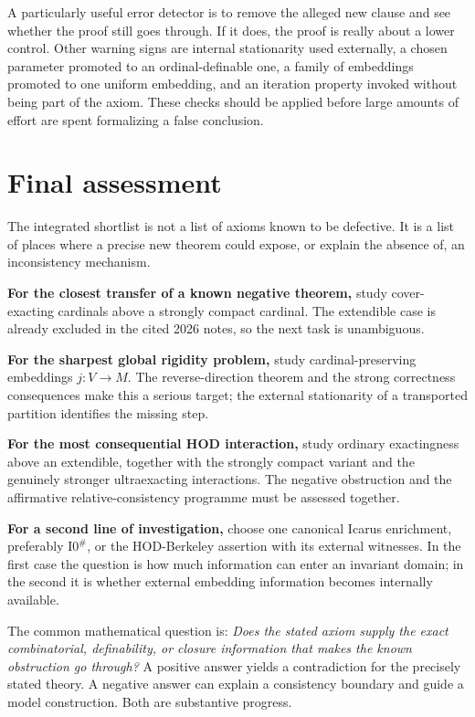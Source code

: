 \documentclass[11pt,letterpaper]{article}
\theoremstyle{definition}
\newcommand{\Isharp}{\mathrm{I0}^{\#}}
\begin{document}
A particularly useful error detector is to remove the alleged new clause and see whether the proof still goes through. If it does, the proof is really about a lower control. Other warning signs are internal stationarity used externally, a chosen parameter promoted to an ordinal-definable one, a family of embeddings promoted to one uniform embedding, and an iteration property invoked without being part of the axiom. These checks should be applied before large amounts of effort are spent formalizing a false conclusion.

\section{Final assessment}\label{sec:conclusion}

The integrated shortlist is not a list of axioms known to be defective. It is a list of places where a precise new theorem could expose, or explain the absence of, an inconsistency mechanism.

\textbf{For the closest transfer of a known negative theorem,} study cover-exacting cardinals above a strongly compact cardinal. The extendible case is already excluded in the cited 2026 notes, so the next task is unambiguous.

\textbf{For the sharpest global rigidity problem,} study cardinal-preserving embeddings $j:V\to M$. The reverse-direction theorem and the strong correctness consequences make this a serious target; the external stationarity of a transported partition identifies the missing step.

\textbf{For the most consequential HOD interaction,} study ordinary exactingness above an extendible, together with the strongly compact variant and the genuinely stronger ultraexacting interactions. The negative obstruction and the affirmative relative-consistency programme must be assessed together.

\textbf{For a second line of investigation,} choose one canonical Icarus enrichment, preferably $\Isharp$, or the HOD-Berkeley assertion with its external witnesses. In the first case the question is how much information can enter an invariant domain; in the second it is whether external embedding information becomes internally available.

The common mathematical question is: \emph{Does the stated axiom supply the exact combinatorial, definability, or closure information that makes the known obstruction go through?} A positive answer yields a contradiction for the precisely stated theory. A negative answer can explain a consistency boundary and guide a model construction. Both are substantive progress.
\end{document}
